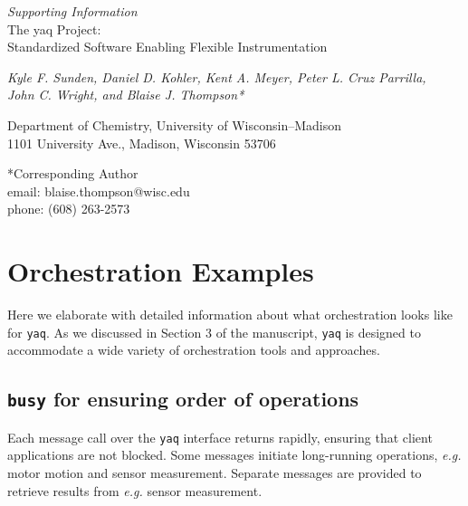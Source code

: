 \documentclass[11pt, full]{article}
\newcommand\yaq{\texttt{yaq}}
\renewcommand{\thefigure}{S\arabic{figure}}
\let\stdsection\section
\renewcommand\section{\clearpage\stdsection}
\begin{document}

\begin{center}
  \LARGE

  \textit{Supporting Information} \\
  The yaq Project: \\
  Standardized Software Enabling Flexible Instrumentation

  \normalsize

  \textit{Kyle F. Sunden, Daniel D. Kohler, Kent A. Meyer, Peter L. Cruz Parrilla, \\
    John C. Wright, and Blaise J. Thompson*}

  Department of Chemistry, University of Wisconsin--Madison\\
  1101 University Ave., Madison, Wisconsin 53706
\end{center}

\vspace{\fill}

*Corresponding Author \\
\hspace*{2ex} email: blaise.thompson@wisc.edu \\
\hspace*{2ex} phone: (608) 263-2573

\pagebreak
\setcounter{page}{1}
\renewcommand{\thepage}{S\arabic{page}}
\renewcommand{\thefigure}{S\arabic{figure}}

\pagebreak
\renewcommand{\baselinestretch}{0.75}\normalsize
\tableofcontents
\renewcommand{\baselinestretch}{1.0}\normalsize

\section{Orchestration Examples}

Here we elaborate with detailed information about what orchestration looks like for \yaq{}.
As we discussed in Section 3 of the manuscript, \yaq{} is designed to accommodate a wide variety of orchestration tools and approaches.

\subsection{\texttt{busy} for ensuring order of operations}

Each message call over the \yaq{} interface returns rapidly, ensuring that client applications are not blocked.
Some messages initiate long-running operations, \emph{e.g.} motor motion and sensor measurement.
Separate messages are provided to retrieve results from \emph{e.g.} sensor measurement.
\end{document}
